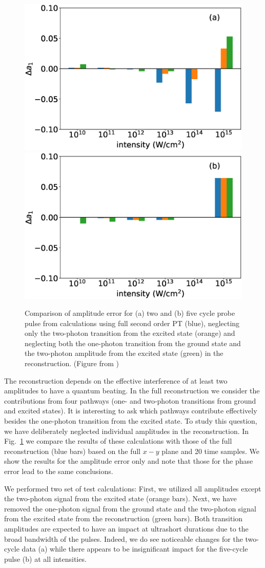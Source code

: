 \begin{figure}[!ht]
\centering
\includegraphics[width=0.49\linewidth]{figs/Photo_ionization/superpositions/Venzke_new_fig_5a.eps}
\includegraphics[width=0.49\linewidth]{figs/Photo_ionization/superpositions/Venzke_new_fig_5b.eps}
\caption{Comparison of amplitude error for (a) two  and (b) five cycle probe pulse from calculations using full second order PT (blue), neglecting only the two-photon transition from the excited state (orange) and neglecting both the one-photon transition from the ground state and the two-photon amplitude from the excited state (green) in the reconstruction. (Figure from \cite{venzke2021_wave})
} 
  \label{fig:pathways}
\end{figure}

The reconstruction depends on the effective interference of at least two amplitudes to have a quantum beating. In the full reconstruction we consider the contributions from four pathways (one- and two-photon transitions from ground and excited states). It is interesting to ask which pathways contribute effectively besides the one-photon transition from the excited state. To study this question, we have deliberately neglected individual amplitudes in the reconstruction. In Fig.\ \ref{fig:pathways} we compare the results of these calculations with those of the full reconstruction (blue bars) based on the full $x-y$ plane and 20 time samples. We show the results for the amplitude error only and note that those for the phase error lead to the same conclusions.

We performed two set of test calculations: First, we utilized all amplitudes except the two-photon signal from the excited state (orange bars). Next, we have removed the one-photon signal from the ground state and the two-photon signal from the excited state from the reconstruction (green bars). Both transition amplitudes are expected to have an impact at ultrashort durations due to the broad bandwidth of the pulses. Indeed, we do see noticeable changes for the two-cycle data (a) while there appears to be insignificant impact for the five-cycle pulse (b) at all intensities.

